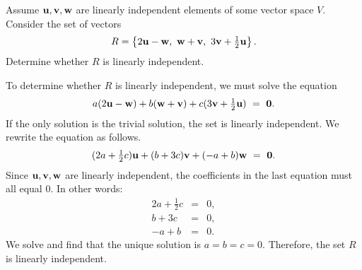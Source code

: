 \begin{ex}
  Assume $\vect{u},\vect{v},\vect{w}$ are linearly independent
  elements of some vector space $V$. Consider the set of vectors
  \begin{equation*}
    \textstyle
    R = \set{2\vect{u} - \vect{w},~
      \vect{w} + \vect{v},~
      3\vect{v} + \frac{1}{2} \vect{u}}.
  \end{equation*}
  Determine whether $R$ is linearly independent.

  \begin{sol}
    To determine whether $R$ is linearly independent, we must solve
    the equation
    \begin{equation*}
      \textstyle
      a(2\vect{u} - \vect{w}) + b(\vect{w} + \vect{v}) + c( 3\vect{v} +
      \frac{1}{2}\vect{u}) ~=~ \vect{0}.
    \end{equation*}
    If the only solution is the trivial solution, the set is linearly
    independent. We rewrite the
    equation as follows.
    \begin{equation*}
      \textstyle
      (2a + \frac{1}{2}c) \vect{u} + (b+3c)\vect{v} + (-a + b) \vect{w} ~=~ \vect{0}.
    \end{equation*}
    Since $\vect{u},\vect{v},\vect{w}$ are linearly independent, the
    coefficients in the last equation must all equal $0$.
    In other words:
    \begin{eqnarray*}
      \textstyle
      2a + \frac{1}{2} c &=& 0, \\
      b + 3c &=& 0, \\
      -a + b &=& 0.
    \end{eqnarray*}
    We solve and find that the unique solution is
    $a=b=c=0$. Therefore, the set $R$ is linearly independent.
  \end{sol}
\end{ex}

